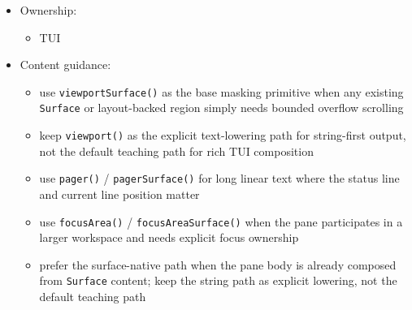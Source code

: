 \begin{itemize}
  \begin{itemize}
  \tightlist
  \item
    the content needs row/column comparison, hierarchy, or domain-specific navigation semantics
  \end{itemize}
\item
  Ownership:

  \begin{itemize}
  \tightlist
  \item
    TUI
  \end{itemize}
\item
  Content guidance:

  \begin{itemize}
  \tightlist
  \item
    use \texttt{v\allowbreak{}i\allowbreak{}e\allowbreak{}w\allowbreak{}p\allowbreak{}o\allowbreak{}r\allowbreak{}t\allowbreak{}S\allowbreak{}u\allowbreak{}r\allowbreak{}f\allowbreak{}a\allowbreak{}c\allowbreak{}e\allowbreak{}(\allowbreak{})} as the base masking primitive when any existing \texttt{S\allowbreak{}u\allowbreak{}r\allowbreak{}f\allowbreak{}a\allowbreak{}c\allowbreak{}e} or layout-backed region simply needs bounded overflow scrolling
  \item
    keep \texttt{v\allowbreak{}i\allowbreak{}e\allowbreak{}w\allowbreak{}p\allowbreak{}o\allowbreak{}r\allowbreak{}t\allowbreak{}(\allowbreak{})} as the explicit text-lowering path for string-first output, not the default teaching path for rich TUI composition
  \item
    use \texttt{p\allowbreak{}a\allowbreak{}g\allowbreak{}e\allowbreak{}r\allowbreak{}(\allowbreak{})} / \texttt{p\allowbreak{}a\allowbreak{}g\allowbreak{}e\allowbreak{}r\allowbreak{}S\allowbreak{}u\allowbreak{}r\allowbreak{}f\allowbreak{}a\allowbreak{}c\allowbreak{}e\allowbreak{}(\allowbreak{})} for long linear text where the status line and current line position matter
  \item
    use \texttt{f\allowbreak{}o\allowbreak{}c\allowbreak{}u\allowbreak{}s\allowbreak{}A\allowbreak{}r\allowbreak{}e\allowbreak{}a\allowbreak{}(\allowbreak{})} / \texttt{f\allowbreak{}o\allowbreak{}c\allowbreak{}u\allowbreak{}s\allowbreak{}A\allowbreak{}r\allowbreak{}e\allowbreak{}a\allowbreak{}S\allowbreak{}u\allowbreak{}r\allowbreak{}f\allowbreak{}a\allowbreak{}c\allowbreak{}e\allowbreak{}(\allowbreak{})} when the pane participates in a larger workspace and needs explicit focus ownership
  \item
    prefer the surface-native path when the pane body is already composed from \texttt{S\allowbreak{}u\allowbreak{}r\allowbreak{}f\allowbreak{}a\allowbreak{}c\allowbreak{}e} content; keep the string path as explicit lowering, not the default teaching path

\end{itemize}
\end{itemize}
